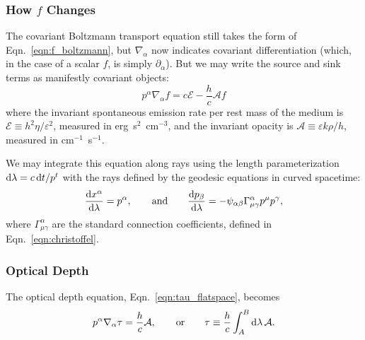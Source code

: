 \subsubsection{How $f$ Changes}
The covariant Boltzmann transport equation still takes the form of
Eqn.~\ref{eqn:f_boltzmann}, but $\nabla_\alpha$ now indicates covariant
differentiation (which, in the case of a scalar $f$, is simply
$\partial_\alpha$). But we may write the source and sink terms as
manifestly covariant objects:
\begin{equation}
  \label{eqn:f_boltzmann_covariant}
  p^\alpha \nabla_\alpha f = c \mathcal{E} - \frac{h}{c} \mathcal{A} f
\end{equation}
where the invariant spontaneous emission rate per rest mass of the medium is
$\mathcal{E}\equiv h^2\eta/\varepsilon^2$, measured in erg~s$^2$~cm$^{-3}$,
and the invariant opacity is
$\mathcal{A}\equiv \varepsilon k \rho/h$, measured in cm$^{-1}$~s$^{-1}$.

We may integrate this equation along rays using the length parameterization
$\mathrm{d}\lambda=c\,\mathrm{d} t/p^t$ with the rays defined by the geodesic equations in
curved spacetime:
\begin{equation}
  \label{eqn:geo_curved_ray}
  \frac{\mathrm{d} x^\alpha}{\mathrm{d} \lambda}=p^\alpha, \qquad {\rm and} \qquad
  \frac{\mathrm{d} p_\beta}{\mathrm{d} \lambda} =-\psi_{\alpha\beta}\Gamma^\alpha_{\mu\gamma} p^\mu p^\gamma,
\end{equation}
where $\Gamma^\alpha_{\mu\gamma}$ are the standard connection coefficients,
defined in Eqn.~\ref{eqn:christoffel}.

\subsubsection{Optical Depth}
The optical depth equation, Eqn.~\ref{eqn:tau_flatspace}, becomes
\begin{equation}
  \label{eqn:tau_covariant}
  p^\alpha\nabla_\alpha \tau = \frac{h}{c} \mathcal{A}, \qquad {\rm or} \qquad
  \tau \equiv \frac{h}{c} \int_A^B \mathrm{d} \lambda\, \mathcal{A}.
\end{equation}
